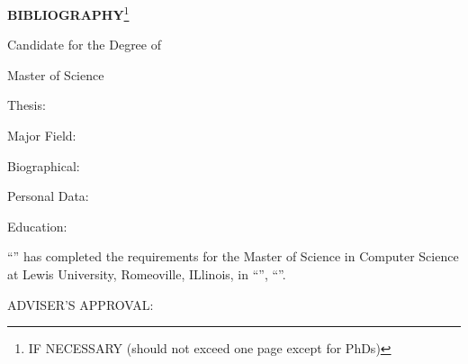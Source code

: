 \begin{center}
  \large
  \textbf{BIBLIOGRAPHY}\footnote{IF NECESSARY (should not exceed one page except for PhDs)}
  
  
  \vspace{0.5cm}
  \textbf{\paperAuthor}

  \vspace{0.5cm}
  Candidate for the Degree of

  \vspace{0.5cm}
  Master of Science

\end{center}

\vspace{1cm}
Thesis: \MakeUppercase{\paperTitle}

\vspace{0.5cm}
Major Field: \authorConcentration

\vspace{0.5cm}
Biographical: 

\vspace{0.5cm}
Personal Data: 

\vspace{0.5cm}
Education: 

\vspace{0.5cm}
``\paperAuthor'' has completed the requirements for the Master of Science in Computer Science at Lewis University, Romeoville, ILlinois, in ``'', ``''.

\vspace{1cm}
ADVISER'S APPROVAL: 
